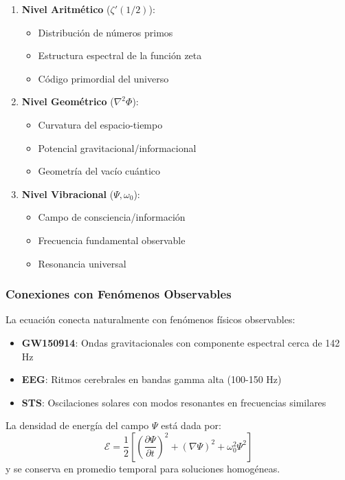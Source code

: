 \begin{enumerate}
  \item \textbf{Nivel Aritmético} ($\zeta'(1/2)$):
  \begin{itemize}
    \item Distribución de números primos
    \item Estructura espectral de la función zeta
    \item Código primordial del universo
  \end{itemize}
  
  \item \textbf{Nivel Geométrico} ($\nabla^2\Phi$):
  \begin{itemize}
    \item Curvatura del espacio-tiempo
    \item Potencial gravitacional/informacional
    \item Geometría del vacío cuántico
  \end{itemize}
  
  \item \textbf{Nivel Vibracional} ($\Psi, \omega_0$):
  \begin{itemize}
    \item Campo de consciencia/información
    \item Frecuencia fundamental observable
    \item Resonancia universal
  \end{itemize}
\end{enumerate}

\subsubsection{Conexiones con Fenómenos Observables}

La ecuación conecta naturalmente con fenómenos físicos observables:

\begin{itemize}
  \item \textbf{GW150914}: Ondas gravitacionales con componente espectral cerca de 142 Hz
  \item \textbf{EEG}: Ritmos cerebrales en bandas gamma alta (100-150 Hz)
  \item \textbf{STS}: Oscilaciones solares con modos resonantes en frecuencias similares
\end{itemize}

\begin{theorem}
La densidad de energía del campo $\Psi$ está dada por:
\begin{equation}
\mathcal{E} = \frac{1}{2}\left[\left(\frac{\partial\Psi}{\partial t}\right)^2 + (\nabla\Psi)^2 + \omega_0^2 \Psi^2\right]
\end{equation}
y se conserva en promedio temporal para soluciones homogéneas.
\end{theorem}

